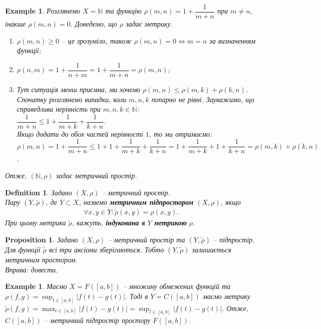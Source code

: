 \documentclass[a4paper, 10pt]{article}
\theoremstyle{theoremdd}
\theoremstyle{theoremdd}
\newtheorem{definition}[theorem]{Definition}
\theoremstyle{theoremdd}
\theoremstyle{theoremdd}
\newtheorem{example}[theorem]{Example}
\theoremstyle{theoremdd}
\newtheorem{proposition}[theorem]{Proposition}
\theoremstyle{theoremdd}
\theoremstyle{theoremdd}
\theoremstyle{theoremdd}
\begin{document}
\begin{example}
Розглянемо $X = \mathbb{N}$ та функцію $\rho(m,n) = 1 + \dfrac{1}{m+n}$ при $m \neq n$, інакше $\rho(m,n) = 0$. Доведемо, що $\rho$ задає метрику.
\begin{enumerate}[nosep,wide=0pt,label={\arabic*)}]
\item $\rho(m,n) \geq 0$ -- це зрозуміло, також $\rho(m,n) = 0 \iff m = n$ за визначенням функції;
\item $\rho(n,m) = 1 + \dfrac{1}{n+m} = 1 + \dfrac{1}{m+n} = \rho(m,n)$;
\item Тут ситуація менш приємна, ми хочемо $\rho(m,n) \leq \rho(m,k) + \rho(k,n)$. Спочатку розглянемо випадки, коли $m,n,k$ попарно не рівні. Зауважимо, що справедлива нерівність при $m,n,k \in \mathbb{N}$:\\
$\dfrac{1}{m+n} \leq 1 + \dfrac{1}{m+k} + \dfrac{1}{k+n}$.\\
Якщо додати до обох частей нерівності $1$, то ми отримаємо:\\
$\rho(m,n) = 1 + \dfrac{1}{m+n} \leq 1 + 1 + \dfrac{1}{m+k} + \dfrac{1}{k+n} = 1 + \dfrac{1}{m+k} + 1 + \dfrac{1}{k+n} = \rho(m,k) + \rho(k,n)$.
\end{enumerate}
Отже, $(\mathbb{N}, \rho)$ задає метричний простір.
\end{example}

\begin{definition}
Задано $(X,\rho)$ -- метричний простір.\\
Пару $(Y,\tilde{\rho})$, де $Y \subset X$, назвемо \textbf{метричним підпростором} $(X,\rho)$, якщо
\begin{align*}
\forall x,y \in Y: \tilde{\rho}(x,y) = \rho(x,y).
\end{align*}
При цьому метрика $\tilde{\rho}$, кажуть, \textbf{індукована в} $Y$ \textbf{метрикою} $\rho$.
\end{definition}

\begin{proposition}
Задано $(X,\rho)$ -- метричний простір та $(Y,\tilde{\rho})$ -- підпростір. Для функції $\tilde{\rho}$ всі три аксіоми зберігаються. Тобто $(Y,\tilde{\rho})$ залишається метричним простором.\\
\textit{Вправа: довести.}
\end{proposition}

\begin{example}
Маємо $X = F([a,b])$ -- множину обмежених функцій та $\rho(f,g) = \displaystyle \sup_{t \in [a,b]} |f(t)-g(t)|$. Тоді в $Y = C([a,b])$ маємо метрику $\tilde{\rho}(f,g) = \displaystyle \max_{t \in [a,b]} |f(t)-g(t)| = \displaystyle \sup_{t \in [a,b]} |f(t)-g(t)|$. Отже, $C([a,b])$ -- метричний підпростір простору $F([a,b])$.
\end{example}
\end{document}
